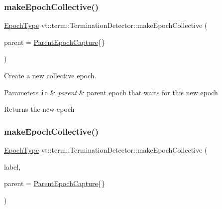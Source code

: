 \subsubsection{\texorpdfstring{make\+Epoch\+Collective()}{makeEpochCollective()}\hspace{0.1cm}{\footnotesize\ttfamily [1/2]}}
{\footnotesize\ttfamily \hyperlink{namespacevt_a81d11b28122d43bf9834577e4a06440f}{Epoch\+Type} vt\+::term\+::\+Termination\+Detector\+::make\+Epoch\+Collective (\begin{DoxyParamCaption}\item[{\hyperlink{structvt_1_1term_1_1_parent_epoch_capture}{Parent\+Epoch\+Capture}}]{parent = {\ttfamily \hyperlink{structvt_1_1term_1_1_parent_epoch_capture}{Parent\+Epoch\+Capture}\{\}} }\end{DoxyParamCaption})}



Create a new collective epoch. 


\begin{DoxyParams}[1]{Parameters}
\mbox{\tt in}  & {\em parent} & parent epoch that waits for this new epoch\\
\hline
\end{DoxyParams}
\begin{DoxyReturn}{Returns}
the new epoch 
\end{DoxyReturn}
\mbox{\label{structvt_1_1term_1_1_termination_detector_a9da0ae37a148a0f6db83488cd44c19cb}} 
\subsubsection{\texorpdfstring{make\+Epoch\+Collective()}{makeEpochCollective()}\hspace{0.1cm}{\footnotesize\ttfamily [2/2]}}
{\footnotesize\ttfamily \hyperlink{namespacevt_a81d11b28122d43bf9834577e4a06440f}{Epoch\+Type} vt\+::term\+::\+Termination\+Detector\+::make\+Epoch\+Collective (\begin{DoxyParamCaption}\item[{std\+::string const \&}]{label,  }\item[{\hyperlink{structvt_1_1term_1_1_parent_epoch_capture}{Parent\+Epoch\+Capture}}]{parent = {\ttfamily \hyperlink{structvt_1_1term_1_1_parent_epoch_capture}{Parent\+Epoch\+Capture}\{\}} }\end{DoxyParamCaption})}



